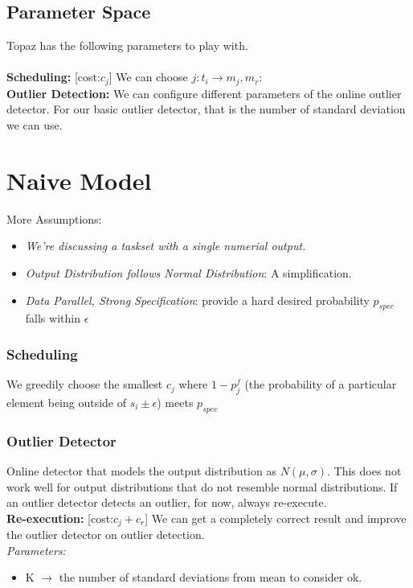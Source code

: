 \documentclass[11pt, oneside]{article}   	%
\begin{document}
\subsection {Parameter Space}
Topaz has the following parameters to play with.\\\\
\textbf{Scheduling:} [cost:$c_j$] We can choose $j : t_i \rightarrow m_j,m_r$:\\
\textbf{Outlier Detection:} We can configure different parameters of the online outlier detector. For our basic outlier detector, that is the number of standard deviation we can use.\\
\section {Naive Model}
More Assumptions:\\
\begin{itemize}
	 \item \textit{We're discussing a taskset with a single numerial output.}
	\item \textit{Output Distribution follows Normal Distribution}: A simplification. 
	\item \textit{Data Parallel, Strong Specification}: provide a hard desired probability $p_{spec}$ falls within $\epsilon$
\end{itemize}
\subsubsection {Scheduling}
We greedily choose the smallest $c_j$ where $1-p_j^f$ (the probability of a particular element being outside of $s_i \pm \epsilon$) meets $p_{spec}$
\subsubsection {Outlier Detector} 
Online detector that models the output distribution as $N(\mu, \sigma)$. This does not work well for output distributions that do not resemble normal distributions. If an outlier detector detects an outlier, for now, always re-execute.\\
\textbf{Re-execution:} [cost:$c_j + c_r$] We can get a completely correct result and improve the outlier detector on outlier detection.\\
\textit{Parameters:}\\
\begin{itemize}
	\item K $\rightarrow$ the number of standard deviations from mean to consider ok.
\end{itemize} 
\end{document}
